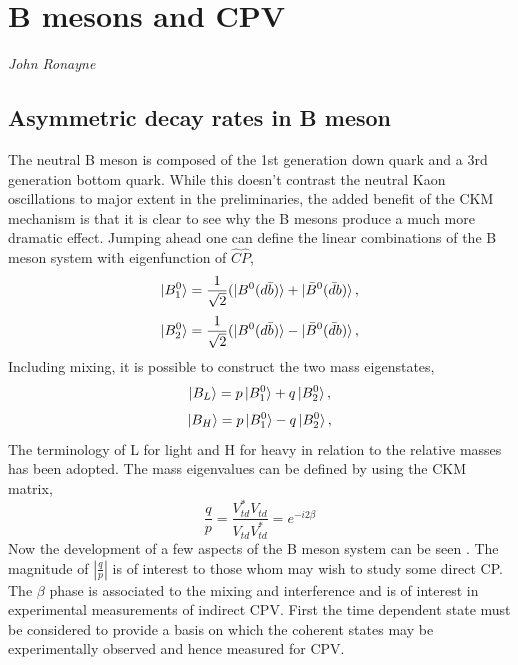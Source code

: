 %

\section{B mesons and CPV}
\vspace{-1.0em}
\begin{center}
\tiny{\textit{John Ronayne}}
\end{center}
\subsection{Asymmetric decay rates in B meson} 
The neutral B meson is composed of the 1st generation down quark and a 3rd generation bottom quark. While this doesn't contrast the neutral Kaon oscillations to major extent in the preliminaries, the added benefit of the CKM mechanism is that it is clear to see why the B mesons produce a much more dramatic effect. Jumping ahead one can define the linear combinations of the B meson system with eigenfunction of $\hat{C}\hat{P}$,
\begin{equation}\label{BPME1}
\ket{B^{0}_{1}}=\frac{1}{\sqrt{2}}(\ket{B^{0}(d\bar{b})}+\ket{\bar{B}^{0}(\bar{d}b)},
\end{equation}
\begin{equation}\label{BPME2}
\ket{B^{0}_{2}}=\frac{1}{\sqrt{2}}(\ket{B^{0}(d\bar{b})}-\ket{\bar{B}^{0}(\bar{d}b)},
\end{equation}
Including mixing, it is possible to construct the two mass eigenstates,
\begin{equation}\label{BPME3}
\ket{B_{L}}=p\ket{B^{0}_{1}}+q\ket{{B}^{0}_{2}},
\end{equation}
\begin{equation}\label{BPME4}
\ket{B_{H}}=p\ket{B^{0}_{1}}-q\ket{{B}^{0}_{2}},
\end{equation}
The terminology of L for light and H for heavy in relation to the relative masses has been adopted. The mass eigenvalues can be defined by using the CKM matrix,
\begin{equation}\label{BPME5}
\frac{q}{p}=\frac{V^{*}_{td}V_{td}}{V_{td}V^{*}_{td}}=e^{-i2\beta}
\end{equation}
Now the development of a few aspects of the B meson system can be seen \cite{B11}. The magnitude of  $\left| \frac{q}{p} \right|$ is of interest to those whom may wish to study some direct CP. The $\beta$ phase is associated to the mixing and interference and is of interest in experimental measurements of indirect CPV. First the time dependent state must be considered to provide a basis on which the coherent states may be experimentally observed and hence measured for CPV. 
\\

